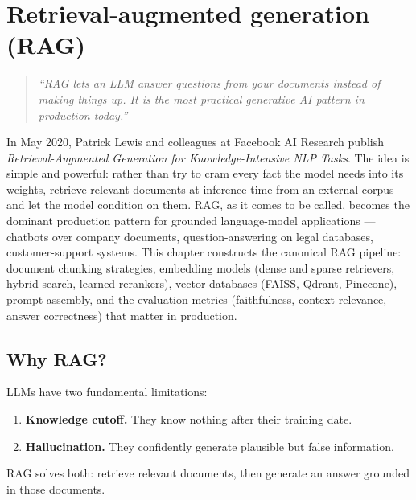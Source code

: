 \chapter{Retrieval-augmented generation (RAG)}
\label{ch:rag}

\begin{quote}
\emph{``RAG lets an LLM answer questions from your documents instead of making things up. It is the most practical generative AI pattern in production today.''}
\end{quote}

In May 2020, Patrick Lewis and colleagues at Facebook AI Research publish \emph{Retrieval-Augmented Generation for Knowledge-Intensive NLP Tasks}. The idea is simple and powerful: rather than try to cram every fact the model needs into its weights, retrieve relevant documents at inference time from an external corpus and let the model condition on them. RAG, as it comes to be called, becomes the dominant production pattern for grounded language-model applications --- chatbots over company documents, question-answering on legal databases, customer-support systems. This chapter constructs the canonical RAG pipeline: document chunking strategies, embedding models (dense and sparse retrievers, hybrid search, learned rerankers), vector databases (FAISS, Qdrant, Pinecone), prompt assembly, and the evaluation metrics (faithfulness, context relevance, answer correctness) that matter in production.

\section{Why RAG?}

LLMs have two fundamental limitations:
\begin{enumerate}
  \item \textbf{Knowledge cutoff.} They know nothing after their training date.
  \item \textbf{Hallucination.} They confidently generate plausible but false information.
\end{enumerate}

RAG solves both: retrieve relevant documents, then generate an answer grounded in those documents.

